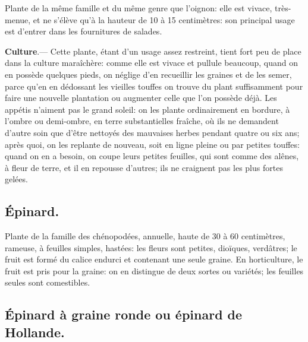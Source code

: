 \documentclass[10pt,a4paper]{book}
\begin{document}
Plante de la même famille et du même genre que l'oignon: elle est vivace, très-menue, et ne s'élève qu'à la hauteur de 10 à 15 centimètres: son principal usage est d'entrer dans les fournitures de salades.

\textbf{Culture}.--- Cette plante, étant d'un usage assez restreint, tient fort peu de place dans la culture maraîchère: comme elle est vivace et pullule beaucoup, quand on en possède quelques pieds, on néglige d'en recueillir les graines et de les semer, parce qu'en en dédossant les vieilles touffes on trouve du plant suffisamment pour faire une nouvelle plantation ou augmenter celle que l'on possède déjà. Les appétis n'aiment pas le grand soleil: on les plante ordinairement en bordure, à l'ombre ou demi-ombre, en terre substantielles fraîche, où ils ne demandent d'autre soin que d'être nettoyés des mauvaises herbes pendant quatre ou six ans; après quoi, on les replante de nouveau, soit en ligne pleine ou par petites touffes: quand on en a besoin, on coupe leurs petites feuilles, qui sont comme des alênes, à fleur de terre, et il en repousse d'autres; ils ne craignent pas les plus fortes gelées.

\subsection{Épinard.}

Plante de la famille des chénopodées, annuelle, haute de 30 à 60 centimètres, rameuse, à feuilles simples, hastées: les fleurs sont petites, dioïques, verdâtres; le fruit est formé du calice endurci et contenant une seule graine. En horticulture, le fruit est pris pour la graine: on en distingue de deux sortes ou variétés; les feuilles seules sont comestibles.

\subsection{Épinard à graine ronde ou épinard de Hollande.}
\end{document}
